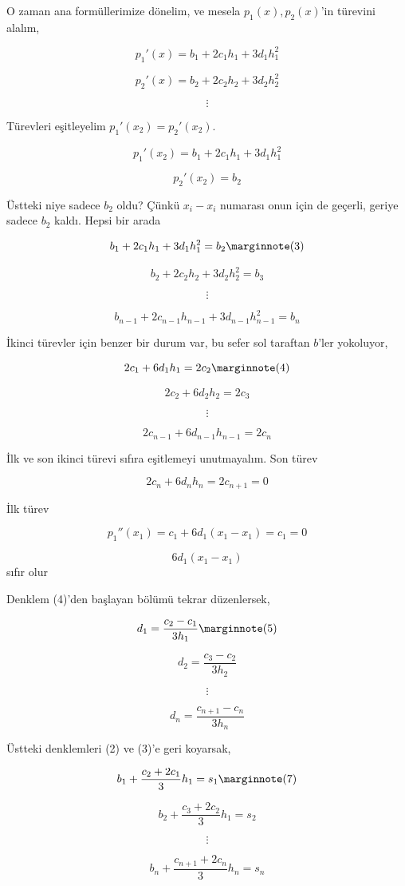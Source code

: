 \documentclass[12pt,fleqn]{article}\usepackage{../../common}
\begin{document}
O zaman ana formüllerimize dönelim, ve mesela $p_1(x),p_2(x)$'in türevini
alalım,

$$ p_1'(x) = b_1 + 2c_1h_1 + 3d_1h_1^2 $$

$$ p_2'(x) = b_2 + 2c_2h_2 + 3d_2h_2^2 $$

$$ \vdots $$

Türevleri eşitleyelim $p_1'(x_2) = p_2'(x_2)$. 

$$ p_1'(x_2) = b_1 + 2c_1h_1 + 3d_1h_1^2 $$

$$  p_2'(x_2) = b_2 $$

Üstteki niye sadece $b_2$ oldu? Çünkü $x_i-x_i$ numarası onun için de
geçerli, geriye sadece $b_2$ kaldı. Hepsi bir arada

$$  b_1 + 2c_1h_1 + 3d_1h_1^2  = b_2 
\mlabel{3}$$

$$  b_2 + 2c_2h_2 + 3d_2h_2^2 = b_3 $$

$$ \vdots $$

$$  b_{n-1} + 2c_{n-1}h_{n-1} + 3d_{n-1}h_{n-1}^2 =  b_n $$

İkinci türevler için benzer bir durum var, bu sefer sol taraftan $b$'ler
yokoluyor, 

$$ 2c_1 + 6d_1h_1 = 2c_2 
\mlabel{4} $$

$$ 2c_2 + 6d_2h_2 = 2c_3 $$

$$ \vdots $$

$$ 2c_{n-1} + 6d_{n-1}h_{n-1} = 2c_n $$

İlk ve son ikinci türevi sıfıra eşitlemeyi unutmayalım. Son türev

$$ 2c_n + 6d_nh_n = 2c_{n+1} = 0 $$

İlk türev

$$ p_1''(x_1) =  c_1 + 6d_1(x_1-x_1)  = c_1 = 0$$

$$ 6d_1(x_1-x_1) $$ sıfır olur

Denklem (4)'den başlayan bölümü tekrar düzenlersek, 

$$ d_1 = \frac{ c_2 - c_1}{3h_1} 
\mlabel{5} $$

$$ d_2 = \frac{ c_3 - c_2}{3h_2} $$

$$ \vdots $$

$$ d_n = \frac{ c_{n+1} - c_n}{3h_n} $$

Üstteki denklemleri (2) ve (3)'e geri koyarsak,

$$ b_1 + \frac{ c_2 + 2c_1}{3}h_1 = s_1 
\mlabel{7} $$

$$ b_2 + \frac{ c_3 + 2c_2}{3}h_1 = s_2 $$

$$ \vdots $$

$$ b_n + \frac{ c_{n+1} + 2c_n}{3}h_n = s_n $$
\end{document}
